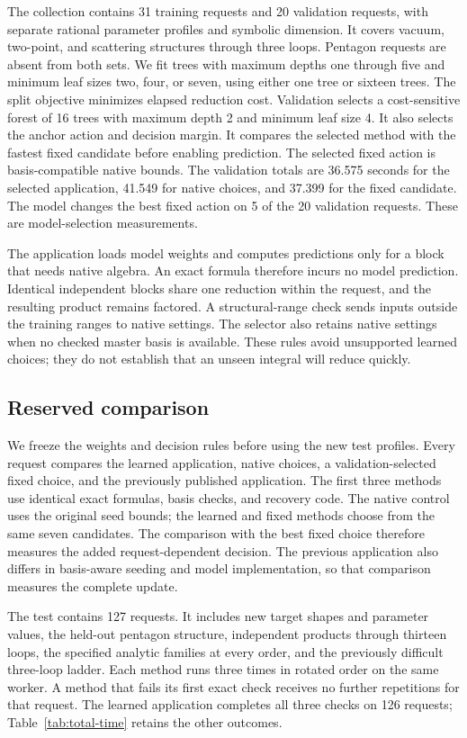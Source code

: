 The collection contains 31 training requests and 20 validation requests, with separate rational parameter profiles and symbolic dimension. It covers vacuum, two-point, and scattering structures through three loops. Pentagon requests are absent from both sets. We fit trees with maximum depths one through five and minimum leaf sizes two, four, or seven, using either one tree or sixteen trees. The split objective minimizes elapsed reduction cost. Validation selects a cost-sensitive forest of 16 trees with maximum depth 2 and minimum leaf size 4. It also selects the anchor action and decision margin. It compares the selected method with the fastest fixed candidate before enabling prediction. The selected fixed action is basis-compatible native bounds. The validation totals are 36.575 seconds for the selected application, 41.549 for native choices, and 37.399 for the fixed candidate. The model changes the best fixed action on 5 of the 20 validation requests. These are model-selection measurements.

The application loads model weights and computes predictions only for a block that needs native algebra. An exact formula therefore incurs no model prediction. Identical independent blocks share one reduction within the request, and the resulting product remains factored. A structural-range check sends inputs outside the training ranges to native settings. The selector also retains native settings when no checked master basis is available. These rules avoid unsupported learned choices; they do not establish that an unseen integral will reduce quickly.

\subsection{Reserved comparison}
We freeze the weights and decision rules before using the new test profiles. Every request compares the learned application, native choices, a validation-selected fixed choice, and the previously published application. The first three methods use identical exact formulas, basis checks, and recovery code. The native control uses the original seed bounds; the learned and fixed methods choose from the same seven candidates. The comparison with the best fixed choice therefore measures the added request-dependent decision. The previous application also differs in basis-aware seeding and model implementation, so that comparison measures the complete update.

The test contains 127 requests. It includes new target shapes and parameter values, the held-out pentagon structure, independent products through thirteen loops, the specified analytic families at every order, and the previously difficult three-loop ladder. Each method runs three times in rotated order on the same worker. A method that fails its first exact check receives no further repetitions for that request. The learned application completes all three checks on 126 requests; Table~\ref{tab:total-time} retains the other outcomes.


